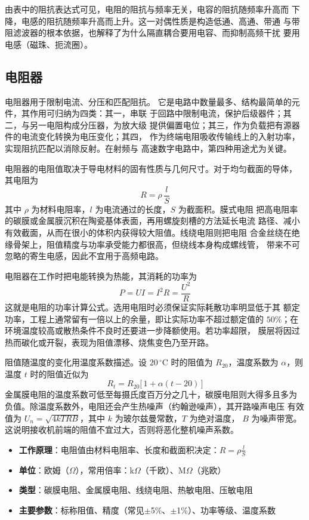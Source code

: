 由表中的阻抗表达式可见，电阻的阻抗与频率无关，电容的阻抗随频率升高而
下降，电感的阻抗随频率升高而上升。这一对偶性质是构造低通、高通、带通
与带阻滤波器的根本依据，也解释了为什么隔直耦合要用电容、而抑制高频干扰
要用电感（磁珠、扼流圈）。

\subsection{电阻器}

电阻器用于限制电流、分压和匹配阻抗。
它是电路中数量最多、结构最简单的元件，其作用可归纳为四类：其一，串联
于回路中限制电流，保护后级器件；其二，与另一电阻构成分压器，为放大级
提供偏置电位；其三，作为负载把有源器件的电流变化转换为电压变化；其四，
作为终端电阻吸收传输线上的入射功率，实现阻抗匹配以消除反射。在射频与
高速数字电路中，第四种用途尤为关键。

电阻器的电阻值取决于导电材料的固有性质与几何尺寸。对于均匀截面的导体，
其电阻为
\[
R = \rho\,\frac{l}{S}
\]
其中 $\rho$ 为材料电阻率，$l$ 为电流通过的长度，$S$ 为截面积。膜式电阻
把高电阻率的碳膜或金属膜沉积在陶瓷基体表面，再用螺旋刻槽的方法延长电流
路径、减小有效截面，从而在很小的体积内获得较大阻值。线绕电阻则把电阻
合金丝绕在绝缘骨架上，阻值精度与功率承受能力都很高，但绕线本身构成螺线管，
带来不可忽略的寄生电感，因此不宜用于高频电路。

电阻器在工作时把电能转换为热能，其消耗的功率为
\[
P = UI = I^2R = \frac{U^2}{R}
\]
这就是电阻的功率计算公式。选用电阻时必须保证实际耗散功率明显低于其
额定功率，工程上通常留有一倍以上的余量，即让实际功率不超过额定值的
$50\%$；在环境温度较高或散热条件不良时还要进一步降额使用。若功率超限，
膜层将因过热而碳化或开裂，表现为阻值漂移、烧焦变色乃至开路。

阻值随温度的变化用温度系数描述。设 $20\,^{\circ}\mathrm{C}$ 时的阻值为
$R_{20}$，温度系数为 $\alpha$，则温度 $t$ 时的阻值近似为
\[
R_t = R_{20}\bigl[\,1 + \alpha (t - 20)\,\bigr]
\]
金属膜电阻的温度系数可低至每摄氏度百万分之几十，碳膜电阻则大得多且多为
负值。除温度系数外，电阻还会产生热噪声（约翰逊噪声），其开路噪声电压
有效值为 $U_n = \sqrt{4kTRB}$，其中 $k$ 为玻尔兹曼常数，$T$ 为绝对温度，
$B$ 为噪声带宽。这说明接收机前端的阻值不宜过大，否则将恶化整机噪声系数。

\begin{itemize}
    \item \textbf{工作原理}：电阻值由材料电阻率、长度和截面积决定：$R = \rho\frac{l}{S}$
    \item \textbf{单位}：欧姆（$\Omega$），常用倍率：k$\Omega$（千欧）、M$\Omega$（兆欧）
    \item \textbf{类型}：碳膜电阻、金属膜电阻、线绕电阻、热敏电阻、压敏电阻
    \item \textbf{主要参数}：标称阻值、精度（常见$\pm$5\%、$\pm$1\%）、功率等级、温度系数
\end{itemize}

